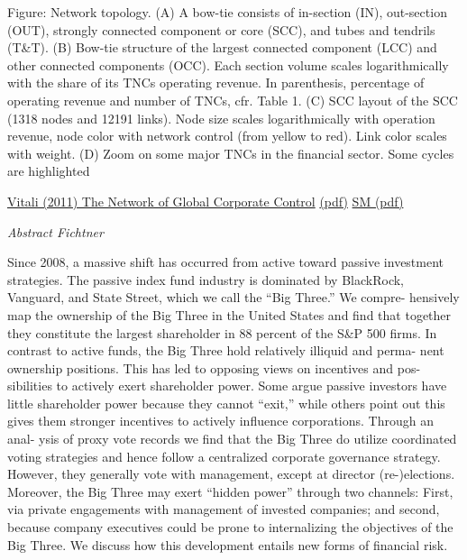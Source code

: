 \documentclass[
]{book}
\begin{document}
Figure: Network topology. (A) A bow-tie consists of in-section (IN), out-section (OUT), strongly connected component or core (SCC), and tubes
and tendrils (T\&T). (B) Bow-tie structure of the largest connected component (LCC) and other connected components (OCC). Each section volume
scales logarithmically with the share of its TNCs operating revenue. In parenthesis, percentage of operating revenue and number of TNCs, cfr. Table 1.
(C) SCC layout of the SCC (1318 nodes and 12191 links). Node size scales logarithmically with operation revenue, node color with network control
(from yellow to red). Link color scales with weight. (D) Zoom on some major TNCs in the financial sector. Some cycles are highlighted

\href{https://journals.plos.org/plosone/article?id=10.1371/journal.pone.0025995}{Vitali (2011) The Network of Global Corporate Control}
\href{pdf/Vitali_2011_Network_Global_Control.pdf}{(pdf)}
\href{pdf/Vitali_2011_Network_Global_Control_SM.pdf}{SM (pdf)}

\emph{Abstract Fichtner}

Since 2008, a massive shift has occurred from active toward passive
investment strategies. The passive index fund industry is dominated by
BlackRock, Vanguard, and State Street, which we call the ``Big Three.'' We compre-
hensively map the ownership of the Big Three in the United States and find that
together they constitute the largest shareholder in 88 percent of the S\&P 500
firms. In contrast to active funds, the Big Three hold relatively illiquid and perma-
nent ownership positions. This has led to opposing views on incentives and pos-
sibilities to actively exert shareholder power. Some argue passive investors have
little shareholder power because they cannot ``exit,'' while others point out this
gives them stronger incentives to actively influence corporations. Through an anal-
ysis of proxy vote records we find that the Big Three do utilize coordinated voting
strategies and hence follow a centralized corporate governance strategy. However,
they generally vote with management, except at director (re-)elections. Moreover,
the Big Three may exert ``hidden power'' through two channels: First, via private
engagements with management of invested companies; and second, because
company executives could be prone to internalizing the objectives of the Big
Three. We discuss how this development entails new forms of financial risk.
\end{document}
